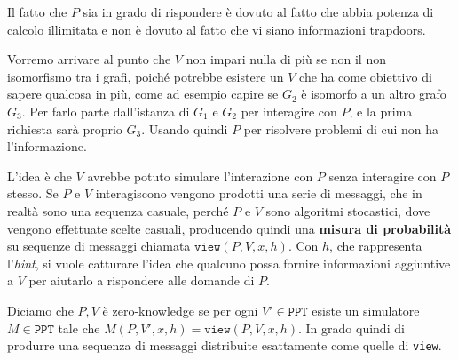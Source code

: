 Il fatto che $P$ sia in grado di rispondere è dovuto al fatto che abbia potenza di calcolo illimitata e non 
è dovuto al fatto che vi siano informazioni trapdoors. 

Vorremo arrivare al punto che $V$ non impari nulla di più se non il non isomorfismo tra i grafi, poiché 
potrebbe esistere un $V$ che ha come obiettivo di sapere qualcosa in più, come ad esempio capire se $G_2$
è isomorfo a un altro grafo $G_3$. Per farlo parte dall'istanza di $G_1$ e $G_2$ per interagire con $P$, 
e la prima richiesta sarà proprio $G_3$. Usando quindi $P$ per risolvere problemi di cui non ha 
l'informazione. 

L'idea è che $V$ avrebbe potuto simulare l'interazione con $P$ senza interagire con $P$ stesso.
Se $P$ e $V$ interagiscono vengono prodotti una serie di messaggi, che in realtà sono una sequenza casuale,
perché $P$ e $V$ sono algoritmi stocastici, dove vengono effettuate scelte casuali, producendo quindi
una \textbf{misura di probabilità} su sequenze di messaggi chiamata $\texttt{view}(P,V,x,h)$. 
Con $h$, che rappresenta l'\textit{hint}, si vuole catturare l'idea che qualcuno possa fornire informazioni 
aggiuntive a $V$ per aiutarlo a rispondere alle domande di $P$.

\begin{tcolorbox}
    Diciamo che $P,V$ è zero-knowledge se per ogni $V'\in \texttt{PPT}$ esiste un simulatore $M \in \texttt{PPT}$
    tale che $M(P,V',x,h) = \texttt{view}(P,V,x,h)$. In grado quindi di produrre una sequenza di messaggi
    distribuite esattamente come quelle di \texttt{view}.   
\end{tcolorbox} 
